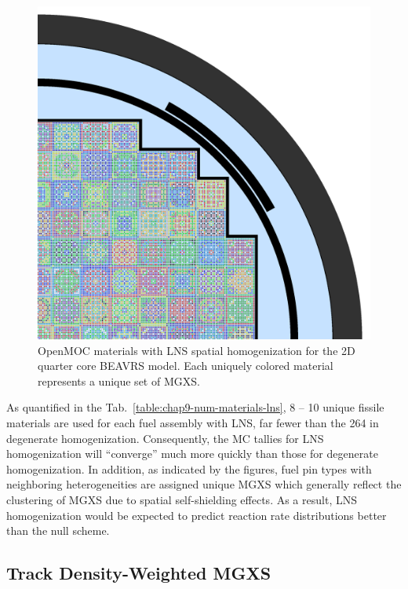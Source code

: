 \begin{figure}[h!]
\centering
\includegraphics[width=\linewidth]{figures/patterns/lns/full-core/materials}
\vspace{2mm}
\caption[Depiction of LNS spatially homogenized materials for BEAVRS]{OpenMOC materials with \ac{LNS} spatial homogenization for the 2D quarter core \ac{BEAVRS} model. Each uniquely colored material represents a unique set of \ac{MGXS}.}
\label{fig:chap9-lns-materials-beavrs}
\end{figure}

As quantified in the Tab.~\ref{table:chap9-num-materials-lns}, 8 -- 10 unique fissile materials are used for each fuel assembly with \ac{LNS}, far fewer than the 264 in degenerate homogenization. Consequently, the \ac{MC} tallies for \ac{LNS} homogenization will ``converge'' much more quickly than those for degenerate homogenization. In addition, as indicated by the figures, fuel pin types with neighboring heterogeneities are assigned unique \ac{MGXS} which generally reflect the clustering of \ac{MGXS} due to spatial self-shielding effects. As a result, \ac{LNS} homogenization would be expected to predict reaction rate distributions better than the null scheme. 

\subsection{Track Density-Weighted MGXS}
\label{sec:chap9-lns-math}


